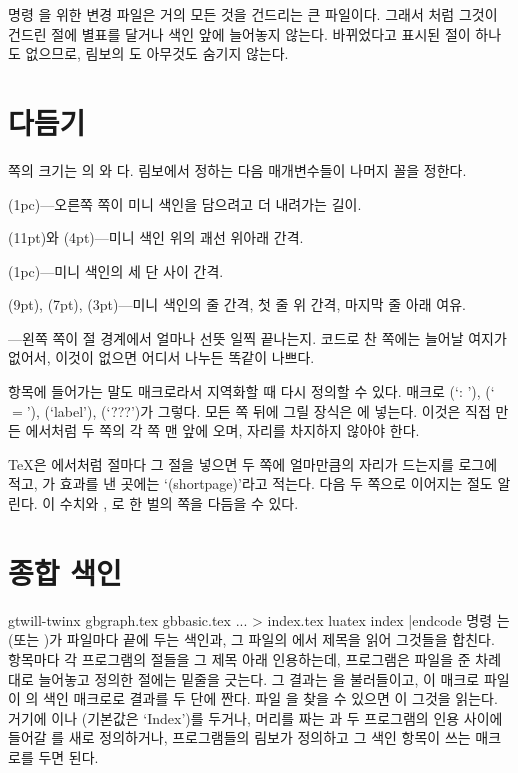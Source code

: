 \bull 명령 을 위한 변경 파일은 거의 모든 것을 건드리는 큰 파일이다.
그래서 처럼 그것이 건드린 절에 별표를 달거나 색인 앞에 늘어놓지
않는다. 바뀌었다고 표시된 절이 하나도 없으므로, 림보의
도 아무것도 숨기지 않는다.

\chapter{다듬기}
\noindent 쪽의 크기는 의 와 다.
림보에서 정하는 다음 매개변수들이 나머지 꼴을 정한다.

\bull {}(1pc)---오른쪽 쪽이 미니 색인을 담으려고 더 내려가는
길이.

\bull {}(11pt)와 (4pt)---미니 색인 위의 괘선
위아래 간격.

\bull {}(1pc)---미니 색인의 세 단 사이 간격.

\bull {}(9pt), (7pt), (3pt)---미니
색인의 줄 간격, 첫 줄 위 간격, 마지막 줄 아래 여유.

\bull {}---왼쪽 쪽이 절 경계에서 얼마나 선뜻 일찍 끝나는지. 코드로
찬 쪽에는 늘어날 여지가 없어서, 이것이 없으면 어디서 나누든 똑같이 나쁘다.

\noindent 항목에 들어가는 말도 매크로라서 지역화할 때 다시 정의할 수 있다. 매크로
(`: '), (`\thinspace$=$\thinspace'),
(`label'), (`???')가 그렇다. 모든 쪽
뒤에 그릴 장식은 에 넣는다. 이것은 직접 만든
에서처럼 두 쪽의 각 쪽 맨 앞에 오며, 자리를 차지하지 않아야
한다.

\TeX{}은 에서처럼 절마다 그 절을 넣으면 두 쪽에 얼마만큼의 자리가
드는지를 로그에 적고, 가 효과를 낸 곳에는 `(shortpage)'라고
적는다. 다음 두 쪽으로 이어지는 절도 알린다. 이 수치와 , 로
한 벌의 쪽을 다듬을 수 있다.

\chapter{종합 색인}
\begincode
gtwill-twinx gbgraph.tex gbbasic.tex ... > index.tex
luatex index
|endcode
명령 는 (또는 )가  파일마다 끝에
두는 색인과, 그 파일의 에서 제목을 읽어 그것들을
합친다. 항목마다 각 프로그램의 절들을 그 제목 아래 인용하는데, 프로그램은 파일을
준 차례대로 늘어놓고 정의한 절에는 밑줄을 긋는다. 그 결과는 을
불러들이고, 이 매크로 파일이 의 색인 매크로로 결과를 두 단에 짠다.
파일 을 찾을 수 있으면 이 그것을 읽는다.
거기에 이나 (기본값은 `Index')를
두거나, 머리를 짜는 과 두 프로그램의 인용 사이에 들어갈
를 새로 정의하거나, 프로그램들의 림보가 정의하고 그 색인
항목이 쓰는 매크로를 두면 된다.

